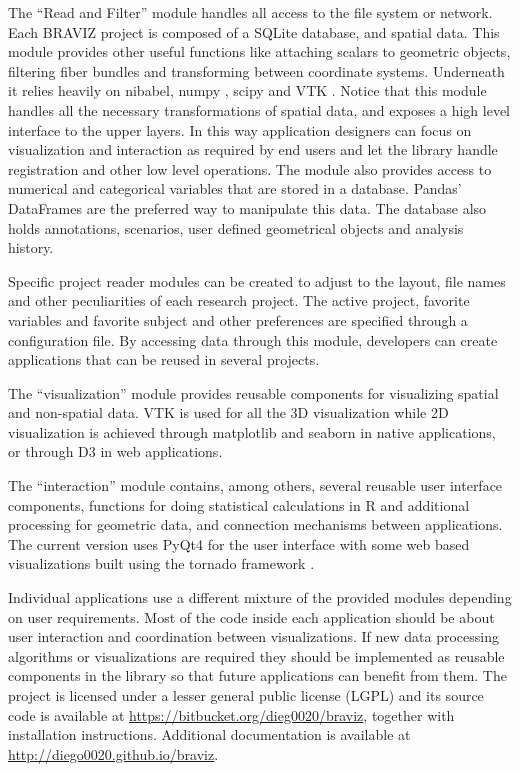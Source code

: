 \documentclass[twocolumn]{svjour3} %
\begin{document}
The ``Read and Filter'' module handles all access to the file system or network. Each BRAVIZ project is composed of a SQLite database, and spatial data. This module provides other useful functions like attaching scalars to geometric objects, filtering fiber bundles and transforming between coordinate systems. Underneath it relies heavily on nibabel\cite{gorgolewski_nipype:_2011}, numpy\cite{van_der_walt_numpy_2011} , scipy\cite{jones_scipy:_2001}\cite{oliphant_python_2007} and VTK\cite{schroeder_vtk_1998} . Notice that this module handles all the necessary transformations of spatial data, and exposes a high level interface to the upper layers. In this way application designers can focus on visualization and interaction as required by end users and let the library handle registration and other low level operations. The module also provides access to numerical and categorical variables that are stored in a database. Pandas' DataFrames\cite{mckinney_data_2010} are the preferred way to manipulate this data. The database also holds annotations, scenarios, user defined geometrical objects and analysis history. 

Specific project reader modules can be created to adjust to the layout, file names and other peculiarities of each research project. The active project, favorite variables and favorite subject and other preferences are specified through a configuration file.
By accessing data through this module, developers can create applications that can be reused in several projects. 

The ``visualization'' module provides reusable components for visualizing spatial and non-spatial data. VTK is used for all the 3D visualization while 2D visualization is achieved through matplotlib \cite{hunter_matplotlib:_2007} and seaborn\cite{michael_waskom_seaborn:_2014} in native applications, or through D3 \cite{bostock_d3_2011} in web applications.

The ``interaction'' module contains, among others, several reusable user interface components, functions for doing statistical calculations in R\cite{team_r:_2012}\cite{gautier_rpy2:_2008} and additional processing for geometric data, and connection mechanisms between applications. The current version uses PyQt4 for the user interface with some web based visualizations built using the tornado framework \cite{server_source_2008}. 

Individual applications use a different mixture of the provided modules depending on user requirements. Most of the code inside each application should be about user interaction and coordination between visualizations. If new data processing algorithms or visualizations are required they should be implemented as reusable components in the library so that future applications can benefit from them. The project is licensed under a lesser general public license (LGPL) and its source code is available at \url{https://bitbucket.org/dieg0020/braviz}, together with installation instructions. Additional documentation is available at \url{http://diego0020.github.io/braviz}.
\end{document}
